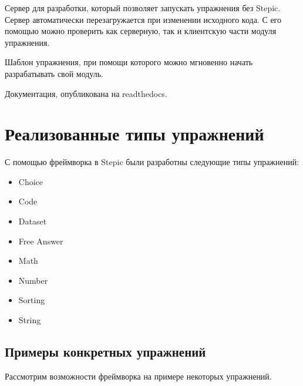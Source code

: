 \documentclass{matmex-diploma-custom}
\begin{document}
Сервер для разработки, который позволяет запускать упражнения без
Stepic. Сервер автоматически перезагружается при изменении исходного
кода. С его помощью можно проверить как серверную, так и клиентскую
части модуля упражнения.

Шаблон упражнения, при помощи которого можно мгновенно начать
разрабатывать свой модуль.

Документация, опубликована на readthedocs\cite{plugins:doc}.

\section{Реализованные типы упражнений}

С помощью фреймворка в Stepic были разработны следующие типы упражнений:
\begin{itemize}
\item Choice
\item Code
\item Dataset
\item Free Answer
\item Math
\item Number
\item Sorting
\item String
\end{itemize}

\subsection{Примеры конкретных упражнений}
Рассмотрим возможности фреймворка на примере некоторых упражнений.
\end{document}
